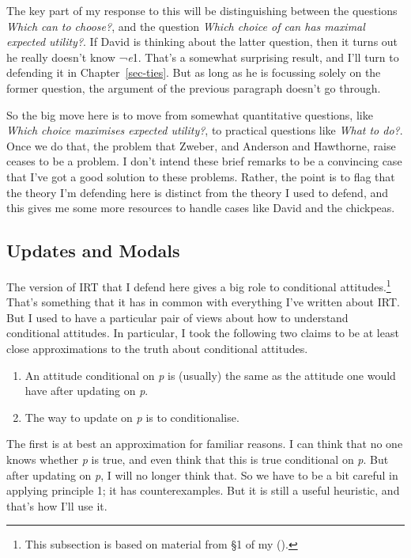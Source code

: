 \documentclass[
  12pt,
  letterpaper,
]{scrbook}
\providecommand{\tightlist}{%
  \setlength{\itemsep}{0pt}\setlength{\parskip}{0pt}}\usepackage{longtable,booktabs,array}
\begin{document}
The key part of my response to this will be distinguishing between the
questions \emph{Which can to choose?}, and the question \emph{Which
choice of can has maximal expected utility?}. If David is thinking about
the latter question, then it turns out he really doesn't know
¬\emph{e}1. That's a somewhat surprising result, and I'll turn to
defending it in Chapter~\ref{sec-ties}. But as long as he is focussing
solely on the former question, the argument of the previous paragraph
doesn't go through.

So the big move here is to move from somewhat quantitative questions,
like \emph{Which choice maximises expected utility?}, to practical
questions like \emph{What to do?}. Once we do that, the problem that
Zweber, and Anderson and Hawthorne, raise ceases to be a problem. I
don't intend these brief remarks to be a convincing case that I've got a
good solution to these problems. Rather, the point is to flag that the
theory I'm defending here is distinct from the theory I used to defend,
and this gives me some more resources to handle cases like David and the
chickpeas.

\subsection{Updates and Modals}\label{sec-modalupdate}

The version of IRT that I defend here gives a big role to conditional
attitudes.\footnote{This subsection is based on material from §1 of my
  ().} That's something that it has
in common with everything I've written about IRT. But I used to have a
particular pair of views about how to understand conditional attitudes.
In particular, I took the following two claims to be at least close
approximations to the truth about conditional attitudes.

\begin{enumerate}
\def\labelenumi{\arabic{enumi}.}
\tightlist
\item
  An attitude conditional on \emph{p} is (usually) the same as the
  attitude one would have after updating on \emph{p}.
\item
  The way to update on \emph{p} is to conditionalise.
\end{enumerate}

The first is at best an approximation for familiar reasons. I can think
that no one knows whether \emph{p} is true, and even think that this is
true conditional on \emph{p}. But after updating on \emph{p}, I will no
longer think that. So we have to be a bit careful in applying principle
1; it has counterexamples. But it is still a useful heuristic, and
that's how I'll use it.
\end{document}
